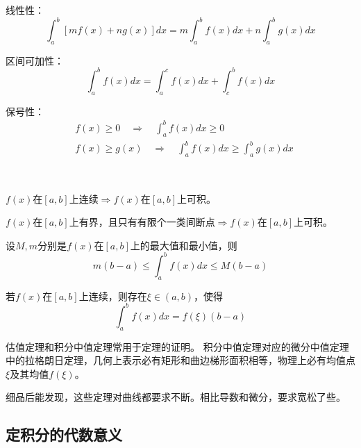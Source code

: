 线性性：
\[
\int_a^b{\left[ mf\left( x \right) +ng\left( x \right) \right] dx}=m\int_a^b{f\left( x \right) dx}+n\int_a^b{g\left( x \right) dx}
\]

区间可加性：
\[
\int_a^b{f\left( x \right) dx}=\int_a^c{f\left( x \right) dx}+\int_c^b{f\left( x \right) dx}
\]

保号性：
\begin{align*}
&f\left( x \right) \geqslant 0 \quad \Rightarrow \quad \int_a^b{f\left( x \right) dx}\geqslant 0 \\
&f\left( x \right) \geqslant g\left( x \right) \quad \Rightarrow \quad \int_a^b{f\left( x \right) dx}\geqslant \int_a^b{g\left( x \right) dx}
\end{align*}

~

\begin{theorem}[连续可积定理]
$f\left( x \right) $在$\left[ a,b \right] $上连续$\Rightarrow f\left( x \right) $在$\left[ a,b \right] $上可积。
\end{theorem}

\begin{theorem}[有界可积定理]
$f\left( x \right) $在$\left[ a,b \right] $上有界，且只有有限个一类间断点$\Rightarrow f\left( x \right) $在$\left[ a,b \right] $上可积。
\end{theorem}

\begin{theorem}[估值定理]
设$M,m$分别是$f\left( x \right) $在$\left[ a,b \right] $上的最大值和最小值，则
\[
m\left( b-a \right) \leqslant \int_a^b{f\left( x \right) dx}\leqslant M\left( b-a \right)
\]
\end{theorem}

\begin{theorem}[积分中值定理]
若$f\left( x \right) $在$\left[ a,b \right] $上连续，则存在$\xi \in \left( a,b \right) $，使得
\[
\int_a^b{f\left( x \right) dx}=f\left( \xi \right) \left( b-a \right)
\]
\end{theorem}

估值定理和积分中值定理常用于定理的证明。
积分中值定理对应的微分中值定理中的拉格朗日定理，几何上表示必有矩形和曲边梯形面积相等，物理上必有均值点$\xi $及其均值$f\left( \xi \right) $。

\begin{tcolorbox}
细品后能发现，这些定理对曲线都要求不断。相比导数和微分，要求宽松了些。
\end{tcolorbox}

\subsection{定积分的代数意义}

